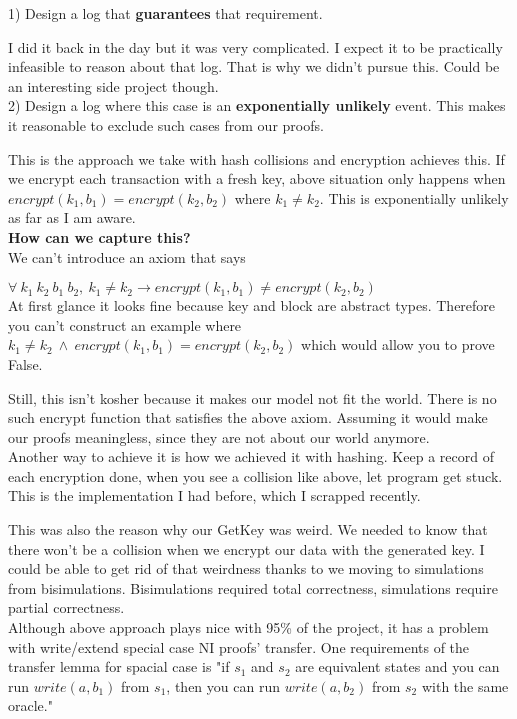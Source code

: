 \documentclass[onecolumn]{paper}
\begin{document}
		1) Design a log that {\bf guarantees} that requirement.
		
		I did it back in the day but it was very complicated. I expect it to be practically infeasible to reason about that log. That is why we didn't pursue this. 
		Could be an interesting side project though.\\
		
		2) Design a log where this case is an {\bf exponentially unlikely} event. 
		This makes it reasonable to exclude such cases from our proofs.
		
		This is the approach we take with hash collisions and encryption achieves this.
		If we encrypt each transaction with a fresh key, above situation only happens when $encrypt(k_1, b_1) = encrypt (k_2, b_2)$ where $k_1 \ne k_2$. This is exponentially unlikely as far as I am aware.\\
		
		{\bf How can we capture this?}\\		
		We can't introduce an axiom that says 
		
		$\forall\ k_1\ k_2\ b_1\ b_2,\ k_1 \ne k_2 \rightarrow encrypt(k_1, b_1) \ne encrypt(k_2, b_2)$\\
		
		At first glance it looks fine because key and block are abstract types. 
		Therefore you can't construct an example where $k_1 \ne k_2\ \wedge\ encrypt(k_1, b_1) = encrypt(k_2, b_2)$ which would allow you to prove False.
		 
		Still, this isn't kosher because it makes our model not fit the world. There is no such encrypt function that satisfies the above axiom. Assuming it would make our proofs meaningless, since they are not about our world anymore.\\
		
		Another way to achieve it is how we achieved it with hashing. Keep a record of each encryption done, when you see a collision like above, let program get stuck. This is the implementation I had before, which I scrapped recently. 
		
		This was also the reason why our GetKey was weird. We needed to know that there won't be a collision when we encrypt our data with the generated key. I could be able to get rid of that weirdness thanks to we moving to simulations from bisimulations.
		Bisimulations required total correctness, simulations require partial correctness.\\
		
		Although above approach plays nice with 95\% of the project, it has a problem with write/extend special case NI proofs' transfer.
		One requirements of the transfer lemma for spacial case is "if $s_1$ and $s_2$ are equivalent states and you can run $write(a, b_1)$ from $s_1$, then you can run $write(a, b_2)$ from $s_2$ with the same oracle."
		
\end{document}

